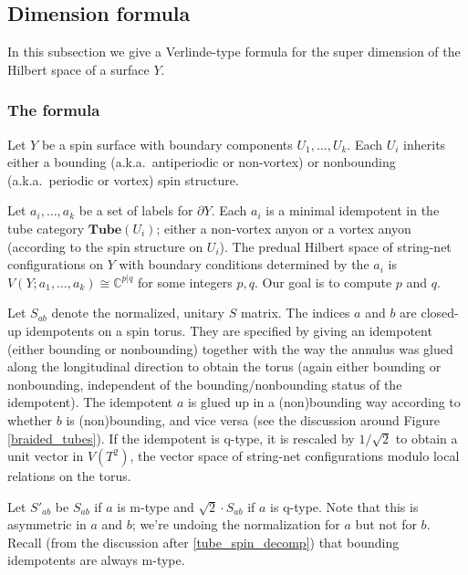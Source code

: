 \documentclass[12pt,a4paper]{article}
\newcommand{\cc}{\mathbb{C}}
\newcommand{\tube}{\textbf{Tube}}
\newcommand{\bd}{\partial}
\begin{document}
\subsection{Dimension formula}

In this subsection we give a Verlinde-type formula for the super dimension of the Hilbert space of a surface $Y$.


\subsubsection{The formula}

Let $Y$ be a spin surface with boundary components $U_1, \ldots, U_k$.
Each $U_i$ inherits either a bounding (a.k.a.\ antiperiodic or non-vortex) or nonbounding 
(a.k.a.\ periodic or vortex) spin structure.

Let $a_i,\ldots, a_k$ be a set of labels for $\bd Y$.
Each $a_i$ is a minimal idempotent in the tube category $\tube(U_i)$; either a non-vortex anyon or a vortex anyon
(according to the spin structure on $U_i$).
The predual Hilbert space of string-net configurations on $Y$ with boundary conditions determined by the $a_i$ is $V(Y; a_1,\ldots, a_k) \cong \cc^{p|q}$ for some integers $p,q$.
Our goal is to compute $p$ and $q$.

\medskip

Let $S_{ab}$ denote the normalized, unitary $S$ matrix.
The indices $a$ and $b$ are closed-up idempotents on a spin torus.
They are specified by giving an idempotent (either bounding or nonbounding) together with
the way the annulus was glued along the longitudinal direction to obtain the torus (again either bounding or nonbounding,
independent of the bounding/nonbounding status of the idempotent).
The idempotent $a$ is glued up in a (non)bounding way according to whether $b$ is (non)bounding, and vice versa (see the discussion around Figure \ref{braided_tubes}).
If the idempotent is q-type, it is rescaled by $1/\sqrt 2$ to obtain a unit vector in $V(T^2)$, the vector space of string-net configurations modulo local relations on the torus.

Let $S'_{ab}$ be $S_{ab}$ if $a$ is m-type and $\sqrt 2 \cdot S_{ab}$ if $a$ is q-type.
Note that this is asymmetric in $a$ and $b$;
we're undoing the normalization for $a$ but not for $b$.
Recall (from the discussion after \eqref{tube_spin_decomp}) that bounding idempotents are always m-type.

\medskip
\end{document}

